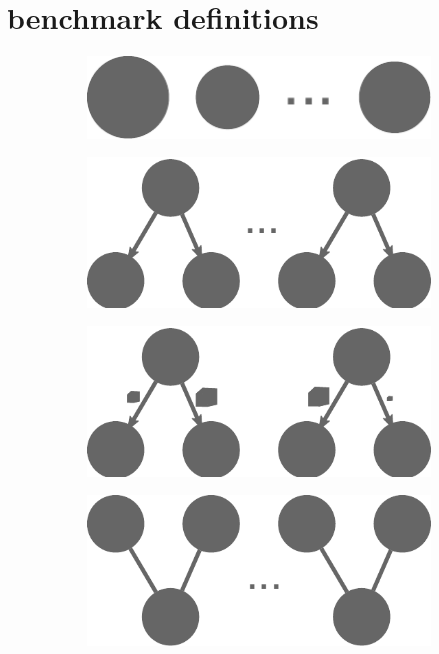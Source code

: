 \chapter{\estee{} benchmark definitions}
\begin{figure}[h]
    \centering
    \begin{subfigure}{.2\textwidth}
        \centering
        \includegraphics[width=.8\textwidth]{imgs/estee/shapes/plain}
        \caption{}
        \label{fig:tg-plain}
    \end{subfigure}%
    \begin{subfigure}{.2\textwidth}
        \centering
        \includegraphics[width=.8\linewidth]{imgs/estee/shapes/fork}
        \caption{}
        \label{fig:tg-fork}
    \end{subfigure}
    \begin{subfigure}{.2\textwidth}
        \centering
        \includegraphics[width=.8\linewidth]{imgs/estee/shapes/fork2}
        \caption{}
        \label{fig:tg-fork2}
    \end{subfigure}
    \begin{subfigure}{.2\textwidth}
        \centering
        \includegraphics[width=.8\linewidth]{imgs/estee/shapes/v}

\end{subfigure}
\end{figure}
